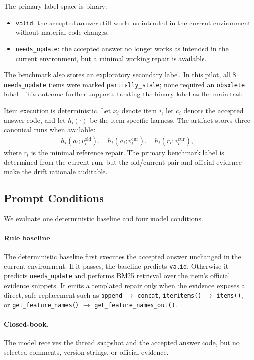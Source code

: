\documentclass{article}
\newcommand{\valid}{\texttt{valid}}
\newcommand{\needsupdate}{\texttt{needs\_update}}
\begin{document}
The primary label space is binary:
\begin{itemize}[leftmargin=1.5em]
  \item \valid: the accepted answer still works as intended in the current environment without material code changes.
  \item \needsupdate: the accepted answer no longer works as intended in the current environment, but a minimal working repair is available.
\end{itemize}

The benchmark also stores an exploratory secondary label. In this pilot, all 8 \needsupdate{} items were marked \texttt{partially\_stale}; none required an \texttt{obsolete} label. This outcome further supports treating the binary label as the main task.

Item execution is deterministic. Let $x_i$ denote item $i$, let $a_i$ denote the accepted answer code, and let $h_i(\cdot)$ be the item-specific harness. The artifact stores three canonical runs when available:
\begin{align*}
h_i(a_i; v_i^{\text{old}}), \quad h_i(a_i; v_i^{\text{cur}}), \quad h_i(r_i; v_i^{\text{cur}}),
\end{align*}
where $r_i$ is the minimal reference repair. The primary benchmark label is determined from the current run, but the old/current pair and official evidence make the drift rationale auditable.

\subsection{Prompt Conditions}

We evaluate one deterministic baseline and four model conditions.

\paragraph{Rule baseline.}
The deterministic baseline first executes the accepted answer unchanged in the current environment. If it passes, the baseline predicts \valid. Otherwise it predicts \needsupdate{} and performs BM25 retrieval over the item's official evidence snippets. It emits a templated repair only when the evidence exposes a direct, safe replacement such as \texttt{append} $\rightarrow$ \texttt{concat}, \texttt{iteritems()} $\rightarrow$ \texttt{items()}, or \texttt{get\_feature\_names()} $\rightarrow$ \texttt{get\_feature\_names\_out()}.

\paragraph{Closed-book.}
The model receives the thread snapshot and the accepted answer code, but no selected comments, version strings, or official evidence.
\end{document}
